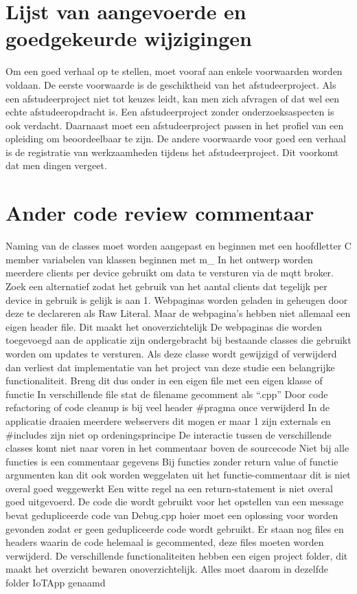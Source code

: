 			\section{Lijst van aangevoerde en goedgekeurde wijzigingen}
			
			Om een goed verhaal op te stellen, moet vooraf aan enkele voorwaarden
			worden voldaan. De eerste voorwaarde is de geschiktheid van het
			afstudeerproject. Als een afstudeerproject niet tot keuzes leidt, kan
			men zich afvragen of dat wel een echte afstudeeropdracht is. Een
			afstudeerproject zonder onderzoeksaspecten is ook verdacht. Daarnaast
			moet een afstudeerproject passen in het profiel van een opleiding om
			beoordeelbaar te zijn. De andere voorwaarde voor goed een verhaal is
			de registratie van werkzaamheden tijdens het afstudeerproject. Dit
			voorkomt dat men dingen vergeet.
			\section{Ander code review commentaar}
			
			Naming van de classes moet worden aangepast en beginnen met een hoofdletter C 
			member variabelen van klassen beginnen met m\_ 
			In het ontwerp worden meerdere clients per device gebruikt om data te versturen via de mqtt broker. Zoek een alternatief zodat het gebruik van het aantal clients dat tegelijk per device in gebruik is gelijk is aan 1. 
			Webpaginas worden geladen in geheugen door deze te declareren als Raw Literal. Maar de webpagina's hebben niet allemaal een eigen header file. Dit maakt het onoverzichtelijk 
			De webpaginas die worden toegevoegd aan de applicatie zijn ondergebracht  bij bestaande classes die gebruikt worden om updates te versturen. Als deze classe wordt gewijzigd of verwijderd dan verliest dat implementatie van het project van deze studie een belangrijke functionaliteit. Breng dit dus onder in een eigen file met een eigen klasse of functie 
			In verschillende file stat de filename gecomment als “.cpp” 
			Door code refactoring of code cleanup is bij veel header #pragma once verwijderd 
			In de applicatie draaien meerdere webservers dit mogen er maar 1 zijn 
			externals en #includes zijn niet op ordeningsprincipe De interactie tussen de verschillende classes komt niet naar voren in het commentaar boven de sourcecode 
			Niet bij alle functies is een commentaar gegevens 
			Bij functies zonder return value of functie argumenten kan dit ook worden weggelaten uit het functie-commentaar dit is niet overal goed weggewerkt 
			Een witte regel na een return-statement is niet overal goed uitgevoerd. 
			De code die wordt gebruikt voor het opstellen van een message bevat gedupliceerde code van Debug.cpp hoier moet een oplossing voor worden gevonden zodat er geen gedupliceerde code wordt gebruikt. 
			Er staan nog files en headers waarin de code helemaal is gecommented, deze files moeten worden verwijderd. 
			De verschillende functionaliteiten hebben een eigen project folder, dit maakt het overzicht bewaren onoverzichtelijk. Alles moet daarom in dezelfde folder IoTApp genaamd 
			
